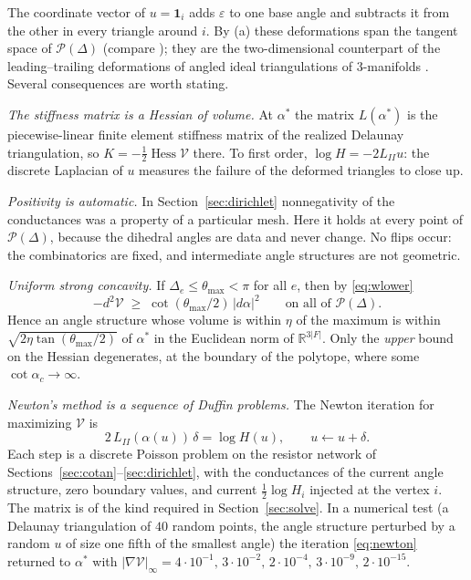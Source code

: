 \documentclass[11pt]{amsart}
\theoremstyle{definition}
\theoremstyle{remark}
\newcommand{\R}{\mathbb{R}}
\newcommand{\eps}{\varepsilon}
\begin{document}
The coordinate vector of $u=\mathbf 1_i$ adds $\eps$ to one base angle and subtracts it from the other in every triangle around $i$. By (a) these deformations span the tangent space of $\mathcal P(\Delta)$ (compare \cite{Riv94}); they are the two-dimensional counterpart of the
leading--trailing deformations of angled ideal triangulations of $3$-manifolds \cite{FG11}.
Several consequences are worth stating.

\emph{The stiffness matrix is a Hessian of volume.} At $\alpha^*$ the matrix $L(\alpha^*)$ is the piecewise-linear finite element stiffness matrix of the realized Delaunay triangulation, so $K=-\frac12\operatorname{Hess}\mathcal V$ there.
To first order, $\log H=-2L_{II}u$: the discrete Laplacian of $u$ measures the failure of the deformed triangles to close up.

\emph{Positivity is automatic.} In Section~\ref{sec:dirichlet} nonnegativity of the conductances was a property of a particular mesh. Here it holds at every point of $\mathcal P(\Delta)$, because the dihedral angles are data and never change. No flips occur: the combinatorics are fixed,
and intermediate angle structures are not geometric.

\emph{Uniform strong concavity.} If $\Delta_e\le\theta_{\max}<\pi$ for all $e$, then by \eqref{eq:wlower}
\[
-d^2\mathcal V\;\ge\;\cot(\theta_{\max}/2)\,|d\alpha|^2\qquad\text{on all of }\mathcal P(\Delta).
\]
Hence an angle structure whose volume is within $\eta$ of the maximum is within
$\sqrt{2\eta\tan(\theta_{\max}/2)}$ of $\alpha^*$ in the Euclidean norm of $\R^{3|F|}$. Only the \emph{upper} bound on the Hessian degenerates, at the boundary of the polytope, where some $\cot\alpha_c\to\infty$.

\emph{Newton's method is a sequence of Duffin problems.} The Newton iteration for maximizing $\mathcal V$ is
\begin{equation}\label{eq:newton}
2\,L_{II}(\alpha(u))\,\delta=\log H(u),\qquad u\leftarrow u+\delta .
\end{equation}
Each step is a discrete Poisson problem on the resistor network of Sections~\ref{sec:cotan}--\ref{sec:dirichlet}, with the conductances of the current angle structure, zero boundary values, and current $\frac12\log H_i$ injected at the vertex $i$.
The matrix is of the kind required in Section~\ref{sec:solve}. In a numerical test (a Delaunay triangulation of $40$ random points, the angle structure perturbed by a random $u$ of size one fifth of the smallest angle)
the iteration \eqref{eq:newton} returned to $\alpha^*$ with $|\nabla\mathcal V|_\infty=4\cdot10^{-1},\,3\cdot10^{-2},\,2\cdot10^{-4},\,3\cdot10^{-9},\,2\cdot10^{-15}$.
\end{document}
